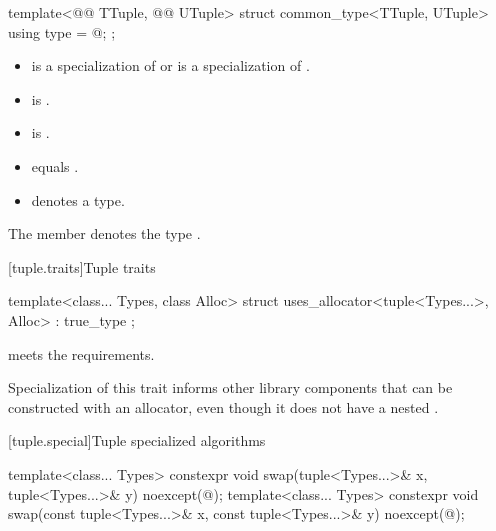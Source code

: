 %
\begin{itemdecl}
template<@@ TTuple, @@ UTuple>
struct common_type<TTuple, UTuple> {
  using type = @\seebelow@;
};
\end{itemdecl}

\begin{itemdescr}
\pnum
\constraints
\begin{itemize}
\item
{} is a specialization of  or
 is a specialization of .
\item
{} is .
\item
{} is .
\item
{} equals .
\item
{} denotes a type.
\end{itemize}
The member   denotes the type
.
\end{itemdescr}

[tuple.traits]{Tuple traits}

%
\begin{itemdecl}
template<class... Types, class Alloc>
  struct uses_allocator<tuple<Types...>, Alloc> : true_type { };
\end{itemdecl}

\begin{itemdescr}
\pnum
\expects
{} meets
the  requirements.

\pnum
\begin{note}
Specialization of this trait informs other library components that
 can be constructed with an allocator, even though it does not have
a nested .
\end{note}
\end{itemdescr}

[tuple.special]{Tuple specialized algorithms}

%
\begin{itemdecl}
template<class... Types>
  constexpr void swap(tuple<Types...>& x, tuple<Types...>& y) noexcept(@\seebelow@);
template<class... Types>
  constexpr void swap(const tuple<Types...>& x, const tuple<Types...>& y) noexcept(@\seebelow@);
\end{itemdecl}

